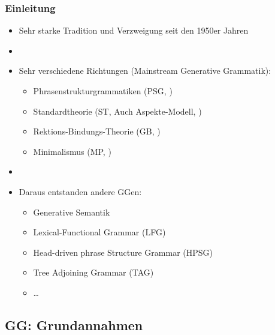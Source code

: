 \begin{frame}
\frametitle{Einleitung}

\begin{itemize}
	\item Sehr starke Tradition und Verzweigung seit den 1950er Jahren
	\item[]
	\item Sehr verschiedene Richtungen (Mainstream Generative Grammatik):
	\begin{itemize}
		\item Phrasenstrukturgrammatiken (PSG, \citet{Chomsky57a})
		\item Standardtheorie (ST, Auch Aspekte-Modell, \citet{Chomsky65a})
		\item \alert{Rektions-Bindungs-Theorie} (GB, \citet{Chomsky81a})
		\item Minimalismus (MP, \citet{Chomsky95a})
	\end{itemize}
	\item[]
	\item Daraus entstanden andere GGen:
	\begin{itemize}
		\item Generative Semantik \citep{Harris93a}
		\item Lexical-Functional Grammar (LFG)
		\item Head-driven phrase Structure Grammar (HPSG)
		\item Tree Adjoining Grammar (TAG)
		\item \dots
	\end{itemize}
\end{itemize}

\citep[s.][]{MuellerS15b}

\end{frame}


\subsection{GG: Grundannahmen}


